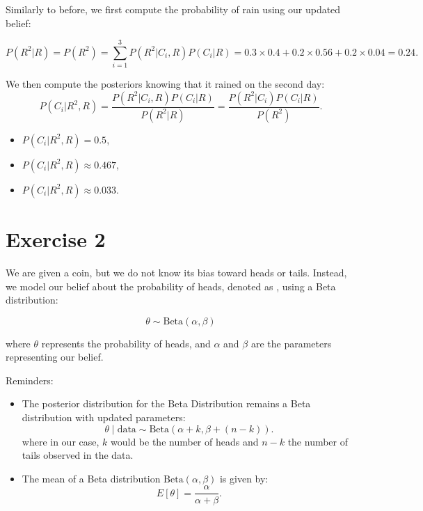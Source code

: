 \documentclass[11pt]{article}
\numberwithin{equation}{section}
\begin{document}
\begin{enumerate}
{    Similarly to before, we first compute the probability of rain using our updated belief:

    \begin{equation*}
        P(R^2|R) = P(R^2) = \sum_{i=1}^3 P(R^2|C_i, R) P(C_i | R) = 0.3 \times 0.4 + 0.2 \times 0.56 + 0.2 \times 0.04 = 0.24.
    \end{equation*}

    We then compute the posteriors knowing that it rained on the second day:
    \begin{equation*}
        P(C_i | R^2, R) = \dfrac{P(R^2 | C_i, R) P(C_i | R)}{P(R^2 | R)} = \dfrac{P(R^2 | C_i) P(C_i | R)}{P(R^2)}.
    \end{equation*}

    \begin{itemize}
        \item $P(C_i | R^2, R) = 0.5$,
        \item $P(C_i | R^2, R) \approx 0.467$,
        \item $P(C_i | R^2, R) \approx 0.033$.
    \end{itemize}
    }

\end{enumerate}

\section*{Exercise 2}
We are given a coin, but we do not know its bias toward heads or tails. Instead, we model our belief about the probability of heads, denoted as , using a Beta distribution:

\begin{equation*}
    \theta \sim \text{Beta}(\alpha, \beta)
\end{equation*}

where $\theta$ represents the probability of heads, and $\alpha$ and $\beta$ are the parameters representing our belief.

Reminders:
\begin{itemize}
    \item The posterior distribution for the Beta Distribution remains a Beta distribution with updated parameters:
\[
\theta \mid \text{data} \sim \text{Beta}(\alpha + k, \beta + (n-k)).
\]
where in our case, $k$ would be the number of heads and $n-k$ the number of tails observed in the data.
    \item The mean of a Beta distribution $\text{Beta}(\alpha, \beta)$ is given by:
    \[
    E[\theta] =  \dfrac{\alpha}{\alpha + \beta}.
\]
\end{itemize}
\end{document}
